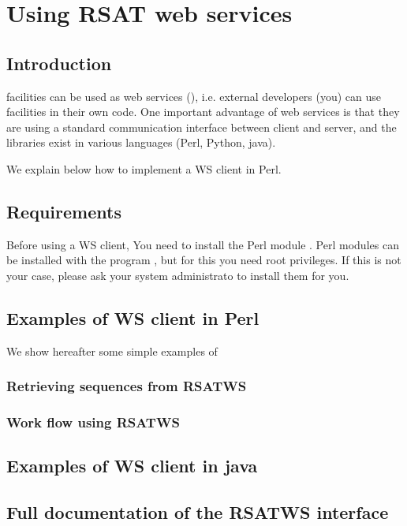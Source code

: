 
\chapter{Using RSAT web services}

\section{Introduction}

\RSAT facilities can be used as web services (), i.e. external developers
(you) can use \RSAT facilities in their own code. One important
advantage of web services is that they are using a standard
communication interface between client and server, and the libraries
exist in various languages (Perl, Python, java).

We explain below how to implement a WS client in Perl. 

\section{Requirements}

Before using a WS client, You need to install the Perl module
. Perl modules can be installed with the program
, but for this you need root privileges. If this is not
your case, please ask your system administrato to install them for
you.

\section{Examples of WS client in Perl}

We show hereafter some simple examples of 

\subsection{Retrieving sequences from RSATWS}


\subsection{Work flow using RSATWS}


\section{Examples of WS client in java}


\section{Full documentation of the RSATWS interface}







